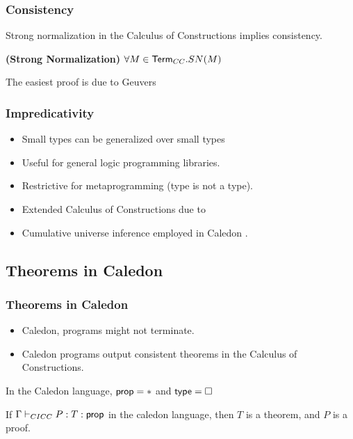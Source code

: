 
\begin{frame}
\frametitle{Consistency}

Strong normalization in the Calculus of Constructions implies consistency.

\begin{theorem}
\textbf{(Strong Normalization)} $\forall M \in \mathsf{Term}_{CC}. SN(M)$
\label{cc:cons}
\end{theorem}

The easiest proof is due to Geuvers \citep{Geuvers94ashort} 

\end{frame}


\begin{frame}
\frametitle{Impredicativity}

\begin{itemize}
\item Small types can be generalized over small types
\item Useful for general logic programming libraries.
\item Restrictive for metaprogramming (type is not a type).
\item Extended Calculus of Constructions due to \citet{luo1989ecc} 
\item Cumulative universe inference employed in Caledon \citep{callaghan2001implementation}.
\end{itemize}

\end{frame}


\subsection{Theorems in Caledon}
\begin{frame}
\frametitle{Theorems in Caledon}

\begin{itemize}
\item Caledon, programs might not terminate. 
\item Caledon programs output consistent theorems in the Calculus of Constructions.
\end{itemize}

\begin{definition}
In the Caledon language, $\mathsf{prop} = *$ and $\mathsf{type} = \Box$
\end{definition}

\begin{definition}
If $\Gamma \vdash_{CICC} P : T : \mathsf{prop}$ in the caledon language, then $T$ is a theorem, and $P$ is a proof.
\end{definition}

\end{frame}
